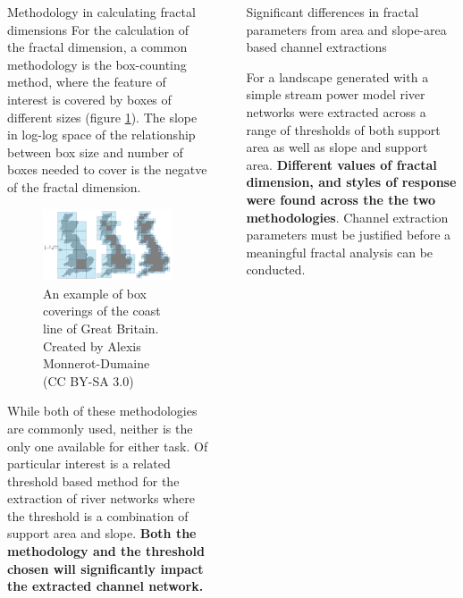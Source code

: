 \documentclass[final]{beamer}
\newlength{\sepwidth}
\newlength{\colwidth}
\newcommand{\separatorcolumn}{\begin{column}{\sepwidth}\end{column}}
\begin{document}
\begin{frame}[t]
\begin{columns}[t]
\begin{column}{\colwidth}
\begin{block}{Methodology in calculating fractal dimensions}
    For the calculation of the fractal dimension, a common methodology is the box-counting method, where the feature of interest is covered by boxes of different sizes (figure \ref{fig:box_covering}).  The slope in log-log space of the relationship between box size and number of boxes needed to cover is the negatve of the fractal dimension.
    \begin{figure}
        \centering
        \includegraphics[width=\textwidth]{GB_box.png}
        \caption{An example of box coverings of the coast line of Great Britain.  Created by Alexis Monnerot-Dumaine (CC BY-SA 3.0)}
        \label{fig:box_covering}
    \end{figure}

    While both of these methodologies are commonly used, neither is the only one available for either task.  Of particular interest is a related threshold based method for the extraction of river networks where the threshold is a combination of support area and slope.  \textbf{Both the methodology and the threshold chosen will significantly impact the extracted channel network.}
  \end{block}


\end{column}

\separatorcolumn

\begin{column}{\colwidth}

  \begin{alertblock}{Significant differences in fractal parameters from area and slope-area based channel extractions}

    For a landscape generated with a simple stream power model \cite{braun2013very} river networks were extracted across a range of thresholds of both support area as well as slope and support area.  \textbf{Different values of fractal dimension, and styles of response were found across the the two methodologies}.  Channel extraction parameters must be justified before a meaningful fractal analysis can be conducted.


\end{alertblock}
\end{column}
\end{columns}
\end{frame}
\end{document}
